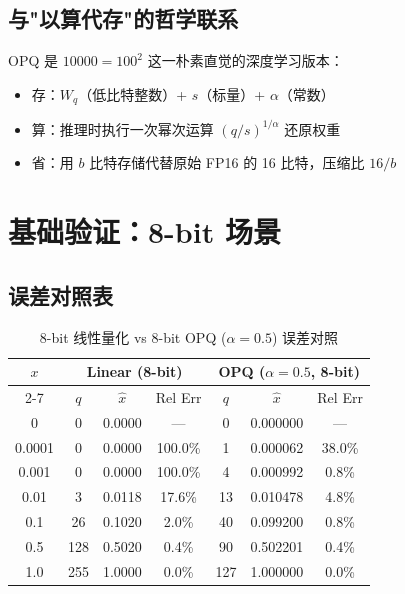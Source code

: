 \documentclass[11pt,a4paper]{article}
\begin{document}
\subsection{与"以算代存"的哲学联系}

OPQ 是 $10000 = 100^2$ 这一朴素直觉的深度学习版本：
\begin{itemize}
\item 存：$W_q$（低比特整数）+ $s$（标量）+ $\alpha$（常数）
\item 算：推理时执行一次幂次运算 $(q/s)^{1/\alpha}$ 还原权重
\item 省：用 $b$ 比特存储代替原始 FP16 的 16 比特，压缩比 $16/b$
\end{itemize}

\section{基础验证：8-bit 场景}

\subsection{误差对照表}

\begin{table}[h]
\centering
\caption{8-bit 线性量化 vs 8-bit OPQ ($\alpha=0.5$) 误差对照}
\label{tab:8bit_basic}
\begin{tabular}{c|c|c|c|c|c|c}
\hline
\multirow{2}{*}{$x$} & \multicolumn{3}{c|}{Linear (8-bit)} & \multicolumn{3}{c}{OPQ ($\alpha{=}0.5$, 8-bit)} \\
\cline{2-7}
 & $q$ & $\hat{x}$ & Rel Err & $q$ & $\hat{x}$ & Rel Err \\
\hline
0       & 0  & 0.0000 & ---    & 0   & 0.000000 & ---    \\
0.0001  & 0  & 0.0000 & 100.0\% & 1   & 0.000062 & 38.0\% \\
0.001   & 0  & 0.0000 & 100.0\% & 4   & 0.000992 & 0.8\%  \\
0.01    & 3  & 0.0118 & 17.6\% & 13  & 0.010478 & 4.8\%  \\
0.1     & 26 & 0.1020 & 2.0\%  & 40  & 0.099200 & 0.8\%  \\
0.5     & 128& 0.5020 & 0.4\%  & 90  & 0.502201 & 0.4\%  \\
1.0     & 255& 1.0000 & 0.0\%  & 127 & 1.000000 & 0.0\%  \\
\hline
\end{tabular}
\end{table}
\end{document}
